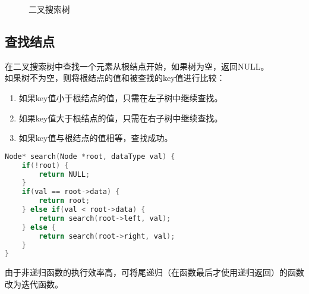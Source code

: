 \begin{figure}[H]
    \centering
    \caption{二叉搜索树}
\end{figure}

\subsection{查找结点}

在二叉搜索树中查找一个元素从根结点开始，如果树为空，返回NULL。 \\

如果树不为空，则将根结点的值和被查找的key值进行比较：

\begin{enumerate}
    \item 如果key值小于根结点的值，只需在左子树中继续查找。
    \item 如果key值大于根结点的值，只需在右子树中继续查找。
    \item 如果key值与根结点的值相等，查找成功。
\end{enumerate}


\begin{lstlisting}[language=C]
Node* search(Node *root, dataType val) {
    if(!root) {
        return NULL;
    }
    if(val == root->data) {
        return root;
    } else if(val < root->data) {
        return search(root->left, val);
    } else {
        return search(root->right, val);
    }
}
\end{lstlisting}

由于非递归函数的执行效率高，可将尾递归（在函数最后才使用递归返回）的函数改为迭代函数。 \\


